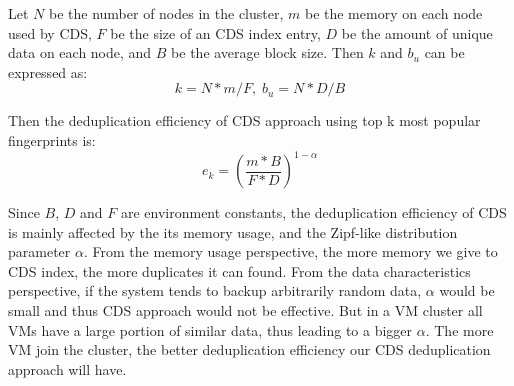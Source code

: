 

Let $N$ be the number of nodes in the cluster, $m$ be the memory on each node used by CDS, 
$F$ be the size of an CDS index entry,
$D$ be the amount of unique data on each node, and $B$ be the average block size. Then $k$ and $b_u$ can be expressed as:
\begin{equation*}
k = N*m/F,\; b_u = N*D/B
\end{equation*}

Then the deduplication efficiency of CDS approach using top k most popular fingerprints is:
\begin{equation}
  e_k = (\frac{m*B}{F*D})^{1-\alpha}
\end{equation}

Since $B$, $D$ and $F$ are environment constants, the deduplication efficiency of CDS is mainly affected by the its memory usage,
and the Zipf-like distribution parameter $\alpha$.
From the memory usage perspective, the more memory we give to CDS index, the more duplicates it can found.
From the data characteristics perspective, if the system tends to backup arbitrarily random data, 
$\alpha$ would be small and thus CDS approach would not be effective. But in a VM cluster all VMs
have a large portion of similar data, thus leading to a bigger $\alpha$. The more VM join the cluster,
the better deduplication efficiency our CDS deduplication approach will have.


